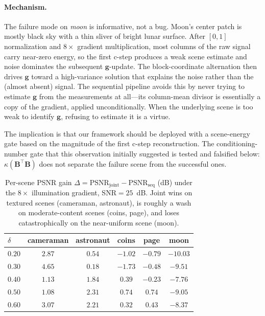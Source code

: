 \documentclass{article}
\begin{document}
\paragraph{Mechanism.} The failure mode on \emph{moon} is informative, not a bug. Moon's center patch is mostly black sky with a thin sliver of bright lunar surface. After $[0,1]$ normalization and $8\times$ gradient multiplication, most columns of the raw signal carry near-zero energy, so the first c-step produces a weak scene estimate and noise dominates the subsequent $\boldsymbol{g}$-update. The block-coordinate alternation then drives $\boldsymbol{g}$ toward a high-variance solution that explains the noise rather than the (almost absent) signal. The sequential pipeline avoids this by never trying to estimate $\boldsymbol{g}$ from the measurements at all---its column-mean divisor is essentially a copy of the gradient, applied unconditionally. When the underlying scene is too weak to identify $\boldsymbol{g}$, refusing to estimate it is a virtue.

The implication is that our framework should be deployed with a scene-energy gate based on the magnitude of the first c-step reconstruction. The conditioning-number gate that this observation initially suggested is tested and falsified below: $\kappa(\boldsymbol{B}^\top\boldsymbol{B})$ does not separate the failure scene from the successful ones.

\begin{table}[t]
  \caption{Per-scene PSNR gain $\Delta = \text{PSNR}_\text{joint} - \text{PSNR}_\text{seq}$ (dB) under the $8\times$ illumination gradient, SNR${=}25$~dB. Joint wins on textured scenes (cameraman, astronaut), is roughly a wash on moderate-content scenes (coins, page), and loses catastrophically on the near-uniform scene (moon).}
  \label{tab:joint-perscene}
  \centering
  \begin{tabular}{lccccc}
    \toprule
    $\delta$ & cameraman & astronaut & coins & page & moon \\
    \midrule
    $0.20$ & $\mathbf{2.87}$ & $\mathbf{0.54}$ & $-1.02$         & $-0.79$         & $-10.03$ \\
    $0.30$ & $\mathbf{4.65}$ & $\mathbf{0.18}$ & $-1.73$         & $-0.48$         & $-9.51$  \\
    $0.40$ & $\mathbf{1.13}$ & $\mathbf{1.84}$ & $\mathbf{0.39}$ & $-0.23$         & $-7.76$  \\
    $0.50$ & $\mathbf{1.08}$ & $\mathbf{2.31}$ & $\mathbf{0.74}$ & $\mathbf{0.74}$ & $-9.05$  \\
    $0.60$ & $\mathbf{3.07}$ & $\mathbf{2.21}$ & $\mathbf{0.32}$ & $\mathbf{0.43}$ & $-8.37$  \\
    \bottomrule
  \end{tabular}
\end{table}
\end{document}
